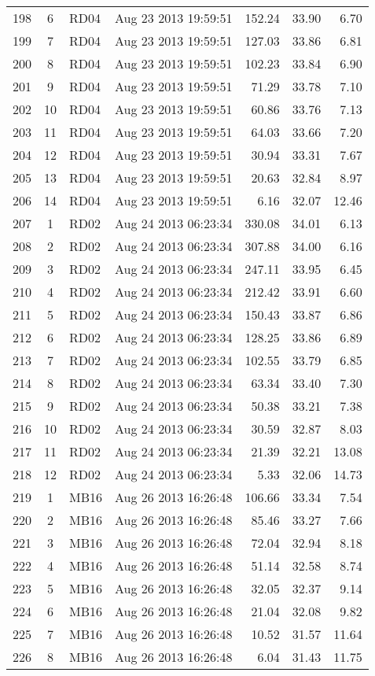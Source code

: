 \begin{longtable}{ccllrrr}
198&6&RD04&Aug 23 2013 19:59:51&152.24&33.90&6.70\\
199&7&RD04&Aug 23 2013 19:59:51&127.03&33.86&6.81\\
200&8&RD04&Aug 23 2013 19:59:51&102.23&33.84&6.90\\
201&9&RD04&Aug 23 2013 19:59:51&71.29&33.78&7.10\\
202&10&RD04&Aug 23 2013 19:59:51&60.86&33.76&7.13\\
203&11&RD04&Aug 23 2013 19:59:51&64.03&33.66&7.20\\
204&12&RD04&Aug 23 2013 19:59:51&30.94&33.31&7.67\\
205&13&RD04&Aug 23 2013 19:59:51&20.63&32.84&8.97\\
206&14&RD04&Aug 23 2013 19:59:51&6.16&32.07&12.46\\
\hline 
207&1&RD02&Aug 24 2013 06:23:34&330.08&34.01&6.13\\
208&2&RD02&Aug 24 2013 06:23:34&307.88&34.00&6.16\\
209&3&RD02&Aug 24 2013 06:23:34&247.11&33.95&6.45\\
210&4&RD02&Aug 24 2013 06:23:34&212.42&33.91&6.60\\
211&5&RD02&Aug 24 2013 06:23:34&150.43&33.87&6.86\\
212&6&RD02&Aug 24 2013 06:23:34&128.25&33.86&6.89\\
213&7&RD02&Aug 24 2013 06:23:34&102.55&33.79&6.85\\
214&8&RD02&Aug 24 2013 06:23:34&63.34&33.40&7.30\\
215&9&RD02&Aug 24 2013 06:23:34&50.38&33.21&7.38\\
216&10&RD02&Aug 24 2013 06:23:34&30.59&32.87&8.03\\
217&11&RD02&Aug 24 2013 06:23:34&21.39&32.21&13.08\\
218&12&RD02&Aug 24 2013 06:23:34&5.33&32.06&14.73\\
\hline 
219&1&MB16&Aug 26 2013 16:26:48&106.66&33.34&7.54\\
220&2&MB16&Aug 26 2013 16:26:48&85.46&33.27&7.66\\
221&3&MB16&Aug 26 2013 16:26:48&72.04&32.94&8.18\\
222&4&MB16&Aug 26 2013 16:26:48&51.14&32.58&8.74\\
223&5&MB16&Aug 26 2013 16:26:48&32.05&32.37&9.14\\
224&6&MB16&Aug 26 2013 16:26:48&21.04&32.08&9.82\\
225&7&MB16&Aug 26 2013 16:26:48&10.52&31.57&11.64\\
226&8&MB16&Aug 26 2013 16:26:48&6.04&31.43&11.75\\

\end{longtable}
